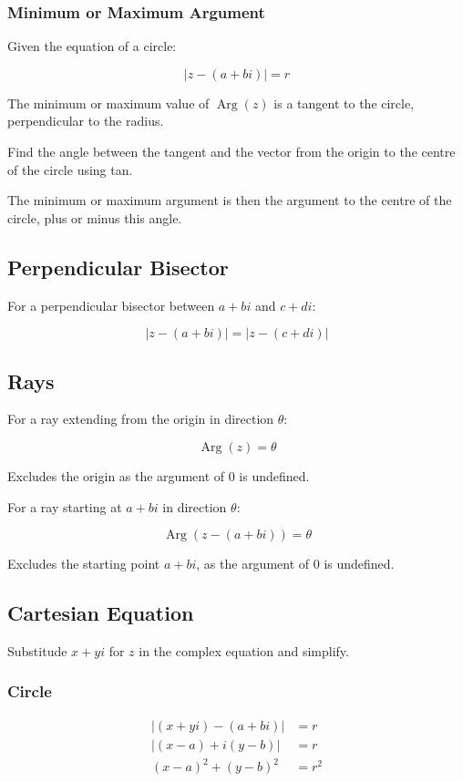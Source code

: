 \documentclass[a4paper,11pt]{report}
\DeclareMathOperator\Arg{Arg}
\begin{document}
\subsubsection{Minimum or Maximum Argument}

Given the equation of a circle:

$$
\lvert z - (a + bi) \rvert = r
$$

The minimum or maximum value of $\Arg(z)$ is a tangent to the circle,
perpendicular to the radius.

Find the angle between the tangent and the vector from the origin to the centre
of the circle using tan.

The minimum or maximum argument is then the argument to the centre of the
circle, plus or minus this angle.

\subsection{Perpendicular Bisector}

For a perpendicular bisector between $a + bi$ and $c + di$:

$$
\lvert z - (a + bi) \rvert = \lvert z - (c + di) \rvert
$$

\subsection{Rays}

For a ray extending from the origin in direction $\theta$:

$$
\Arg(z) = \theta
$$

Excludes the origin as the argument of 0 is undefined.

For a ray starting at $a + bi$ in direction $\theta$:

$$
\Arg(z - (a + bi)) = \theta
$$

Excludes the starting point $a + bi$, as the argument of 0 is undefined.

\subsection{Cartesian Equation}

Substitude $x + yi$ for $z$ in the complex equation and simplify.

\subsubsection{Circle}

$$
\begin{aligned}
\lvert (x + yi) - (a + bi) \rvert & = r \\
\lvert (x - a) + i(y - b) \rvert & = r \\
(x - a)^2 + (y - b)^2 & = r^2 \\
\end{aligned}
$$
\end{document}
